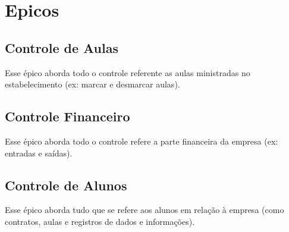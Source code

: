 \section[Epicos]{Epicos}
\subsection[Controle de Aulas]{Controle de Aulas}
Esse épico aborda todo o controle referente as aulas ministradas no estabelecimento (ex: marcar e desmarcar aulas).

\subsection[Controle Financeiro]{Controle Financeiro}
Esse épico aborda todo o controle refere a parte financeira da empresa (ex: entradas e saídas).

\subsection[Controle de Alunos]{Controle de Alunos}
Esse épico aborda tudo que se refere aos alunos em relação à empresa (como contratos, aulas e registros de dados e informações).
